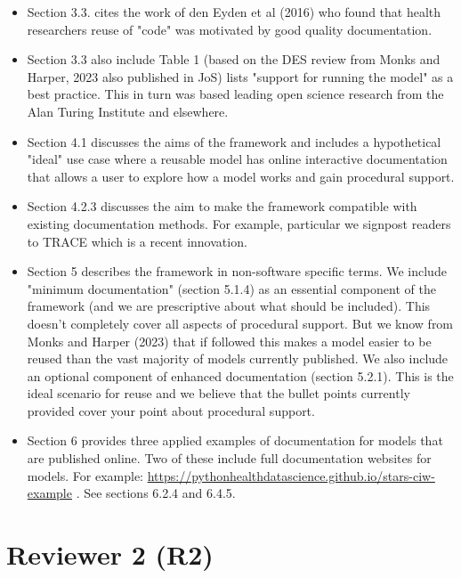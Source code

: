 \documentclass{article}
\begin{document}
\begin{itemize}

\item Section 3.3. cites the work of den Eyden et al (2016) who found that health researchers reuse of "code" was motivated by good quality documentation.

\item Section 3.3 also include Table 1 (based on the DES review from Monks and Harper, 2023 also published in JoS) lists "support for running the model" as a best practice. This in turn was based leading open science research from the Alan Turing Institute and elsewhere.

\item Section 4.1 discusses the aims of the framework and includes a hypothetical "ideal" use case where a reusable model has online interactive documentation that allows a user to explore how a model works and gain procedural support.

\item Section 4.2.3 discusses the aim to make the framework compatible with existing documentation methods. For example, particular we signpost readers to TRACE which is a recent innovation. 

\item Section 5 describes the framework in non-software specific terms.  We include "minimum documentation" (section 5.1.4) as an essential component of the framework (and we are prescriptive about what should be included). This doesn't completely cover all aspects of procedural support.  But we know from Monks and Harper (2023) that if followed this makes a model easier to be reused than the vast majority of models currently published.   We also include an optional component of enhanced documentation (section 5.2.1). This is the ideal scenario for reuse and we believe that the bullet points currently provided cover your point about procedural support.

\item Section 6 provides three applied examples of documentation for models that are published online.  Two of these include full documentation websites for models. For example: \url{https://pythonhealthdatascience.github.io/stars-ciw-example} . See sections 6.2.4 and 6.4.5.

\end{itemize}

\section{Reviewer 2 (R2)}
\end{document}
